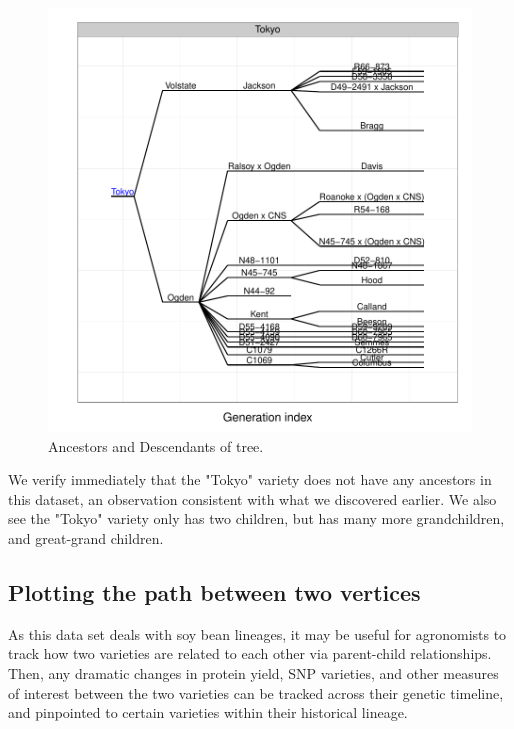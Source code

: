 \documentclass{article}
\numberwithin{equation}{section} %
\begin{document}
\begin{figure} 
  \begin{center} 
\includegraphics{ggenealogy-plotAncDes2}
\end{center} 
\caption{Ancestors and Descendants of tree.}
\label{fig:plotAncDes2}
\end{figure}

We verify immediately that the "Tokyo" variety does not have any ancestors in this dataset, an observation consistent with what we discovered earlier. We also see the "Tokyo" variety only has two children, but has many more grandchildren, and great-grand children.

\subsection{Plotting the path between two vertices}

As this data set deals with soy bean lineages, it may be useful for agronomists to track how two varieties are related to each other via parent-child relationships. Then, any dramatic changes in protein yield, SNP varieties, and other measures of interest between the two varieties can be tracked across their genetic timeline, and pinpointed to certain varieties within their historical lineage.
\end{document}
